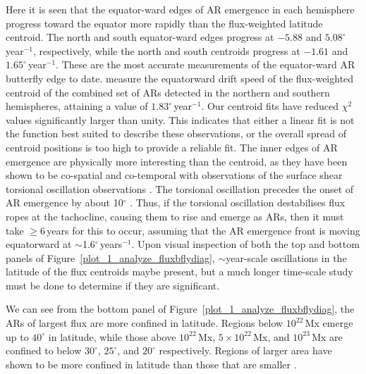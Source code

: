 Here it is seen that the equator-ward edges of \gls{AR} emergence in each hemisphere progress toward the equator more rapidly than the flux-weighted latitude centroid. The north and south equator-ward edges progress at $-5.88$ and $5.08^{\circ}$\,year$^{-1}$, respectively, while the north and south centroids progress at $-1.61$ and $1.65^{\circ}$\,year$^{-1}$. These are the most accurate measurements of the equator-ward \gls{AR} butterfly edge to date.
\citet{zhang:2010} measure the equatorward drift speed of the flux-weighted centroid of the combined set of \glspl{AR} detected in the northern and southern hemispheres, attaining a value of $1.83^{\circ}$\,year$^{-1}$. 
Our centroid fits have reduced $\chi^2$ values significantly larger than unity. This indicates that either a linear fit is not the function best suited to describe these observations, or the overall spread of centroid positions is too high to provide a reliable fit.  
The inner edges of \gls{AR} emergence are physically more interesting than the centroid, as they have been shown to be co-spatial and co-temporal with observations of the surface shear torsional oscillation observations \citep{Howe:2011}. The torsional oscillation precedes the onset of \gls{AR} emergence by about 10$^{\circ}$ \citep{Haber:2002}. Thus, if the torsional oscillation destabilises flux ropes at the tachocline, causing them to rise and emerge as \glspl{AR}, then it must take $\ge$6\,years for this to occur, assuming that the \gls{AR} emergence front is moving equatorward at $\sim$1.6$^{\circ}$\,years$^{-1}$.  
Upon visual inspection of both the top and bottom panels of Figure~\ref{plot_1_analyze_fluxbflydiag}, $\sim$year-scale oscillations in the latitude of the flux centroids maybe present, but a much longer time-scale study must be done to determine if they are significant. 

We can see from the bottom panel of Figure~\ref{plot_1_analyze_fluxbflydiag}, the \glspl{AR} of largest flux are more confined in latitude. Regions below $10^{22}$\,Mx emerge up to $40^\circ$ in latitude, while those above  $10^{22}$\,Mx,  $5\times10^{22}$\,Mx, and  $10^{23}$\,Mx are confined to below $30^\circ$, $25^\circ$, and $20^\circ$ respectively. Regions of larger area have shown to be more confined in latitude than those that are smaller \citep{tang:1984,harvey:1993,meunier:2003}.


